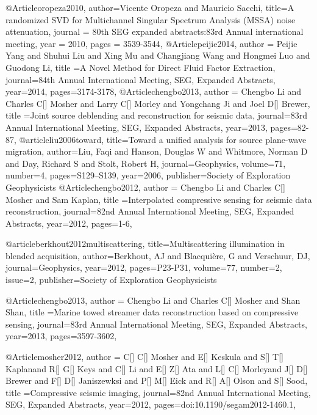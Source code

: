 @Article{oropeza2010,
  author={Vicente Oropeza and Mauricio Sacchi},
  title={A randomized SVD for Multichannel Singular Spectrum Analysis (MSSA) noise attenuation},
  journal = 	 {80th SEG expanded abstracts:83rd Annual international meeting},
  year = 	 2010,
  pages =	 {3539-3544},
}
@Article{peijie2014,
  author = {Peijie Yang and Shuhui Liu and Xing Mu and Changjiang Wang and Hongmei Luo and Guodong Li},
  title ={A Novel Method for Direct Fluid Factor Extraction},
  journal={84th Annual International Meeting, SEG, Expanded Abstracts},
  year=2014,
  pages={3174-3178},
}
@Article{chengbo2013,
  author = {Chengbo Li and Charles C[] Mosher and Larry C[] Morley and Yongchang Ji and Joel D[] Brewer},
  title ={Joint source deblending and reconstruction for seismic data},
  journal={83rd Annual International Meeting, SEG, Expanded Abstracts},
  year=2013,
  pages={82-87},
}
@article{liu2006toward,
  title={Toward a unified analysis for source plane-wave migration},
  author={Liu, Faqi and Hanson, Douglas W and Whitmore, Norman D and Day, Richard S and Stolt, Robert H},
  journal={Geophysics},
  volume={71},
  number={4},
  pages={S129--S139},
  year={2006},
  publisher={Society of Exploration Geophysicists}
}
@Article{chengbo2012,
  author = {Chengbo Li and Charles C[] Mosher and Sam Kaplan},
  title ={Interpolated compressive sensing for seismic data reconstruction},
  journal={82nd Annual International Meeting, SEG, Expanded Abstracts},
  year=2012,
  pages={1-6},
}

@article{berkhout2012multiscattering,
  title={Multiscattering illumination in blended acquisition},
  author={Berkhout, AJ and Blacqui{\`e}re, G and Verschuur, DJ},
  journal={Geophysics},
  year={2012},
  pages={P23-P31},
  volume=77,
  number=2,
  issue=2,
  publisher={Society of Exploration Geophysicists}
}

@Article{chengbo2013,
  author = {Chengbo Li and Charles C[] Mosher and Shan Shan},
  title ={Marine towed streamer data reconstruction based on compressive sensing},
  journal={83rd Annual International Meeting, SEG, Expanded Abstracts},
  year=2013,
  pages={3597-3602},
}

@Article{mosher2012,
  author = {C[] C[] Mosher and E[] Keskula and S[] T[] Kaplanand R[] G[] Keys and C[] Li and E[] Z[] Ata and L[] C[] Morleyand J[] D[] Brewer and F[] D[] Janiszewksi and P[] M[] Eick and R[] A[] Olson and S[] Sood},
  title ={Compressive seismic imaging},
  journal={82nd Annual International Meeting, SEG, Expanded Abstracts},
  year=2012,
  pages={doi:10.1190/segam2012-1460.1},
}


